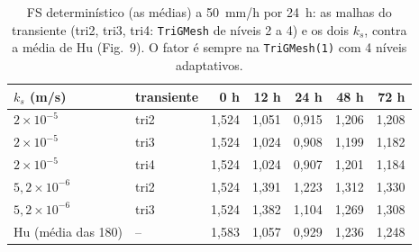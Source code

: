 \begin{table}[htbp]\centering\footnotesize
\caption{FS determinístico (as médias) a 50~mm/h por 24~h: as malhas do transiente (tri2, tri3, tri4: \texttt{TriGMesh} de níveis 2 a 4) e os dois $k_s$, contra a média de Hu (Fig.~9). O fator é sempre na \texttt{TriGMesh(1)} com 4 níveis adaptativos.}\label{tab:det}
\begin{tabular}{llrrrrr}\toprule
$k_s$ (m/s) & transiente & 0 h & 12 h & 24 h & 48 h & 72 h \\\midrule
$2 \times 10^{-5}$ & tri2 & 1{,}524 & 1{,}051 & 0{,}915 & 1{,}206 & 1{,}208 \\
$2 \times 10^{-5}$ & tri3 & 1{,}524 & 1{,}024 & 0{,}908 & 1{,}199 & 1{,}182 \\
$2 \times 10^{-5}$ & tri4 & 1{,}524 & 1{,}024 & 0{,}907 & 1{,}201 & 1{,}184 \\
$5{,}2 \times 10^{-6}$ & tri2 & 1{,}524 & 1{,}391 & 1{,}223 & 1{,}312 & 1{,}330 \\
$5{,}2 \times 10^{-6}$ & tri3 & 1{,}524 & 1{,}382 & 1{,}104 & 1{,}269 & 1{,}308 \\
\midrule Hu (média das 180) & -- & 1{,}583 & 1{,}057 & 0{,}929 & 1{,}236 & 1{,}248 \\
\bottomrule\end{tabular}\end{table}
